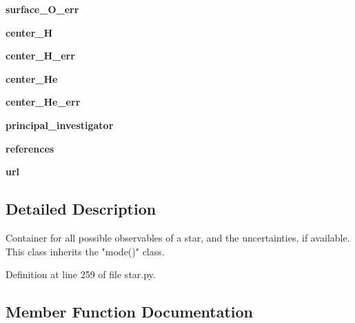 \begin{DoxyCompactItemize}
\mbox{\label{classasamba_1_1star_1_1star_a505218c62a31e5bb61b2822040d87028}} 
{\bfseries surface\+\_\+\+O\+\_\+err}
\item 
\mbox{\label{classasamba_1_1star_1_1star_a8252f0a54aa01752eadcb1342a6c35cd}} 
{\bfseries center\+\_\+H}
\item 
\mbox{\label{classasamba_1_1star_1_1star_a4c8093e51c1fe37d10c9186aaa972793}} 
{\bfseries center\+\_\+\+H\+\_\+err}
\item 
\mbox{\label{classasamba_1_1star_1_1star_abc2e548e03a7224e0aed1f5cd69317be}} 
{\bfseries center\+\_\+\+He}
\item 
\mbox{\label{classasamba_1_1star_1_1star_a7515833b54158162ef38212c9babb910}} 
{\bfseries center\+\_\+\+He\+\_\+err}
\item 
\mbox{\label{classasamba_1_1star_1_1star_a89631fb850b002759c4e08b3377536a3}} 
{\bfseries principal\+\_\+investigator}
\item 
\mbox{\label{classasamba_1_1star_1_1star_a6e1ada4846d84c80523313edaa09b5bc}} 
{\bfseries references}
\item 
\mbox{\label{classasamba_1_1star_1_1star_a5d06a6f0a74d4934527b5776b6d16a60}} 
{\bfseries url}
\end{DoxyCompactItemize}


\subsection{Detailed Description}
\begin{DoxyVerb}Container for all possible observables of a star, and the uncertainties, if available. This class
inherits the "mode()" class.
\end{DoxyVerb}
 

Definition at line 259 of file star.\+py.



\subsection{Member Function Documentation}
\mbox{\label{classasamba_1_1star_1_1star_a388403867f4905df1f6c983131535379}} 
